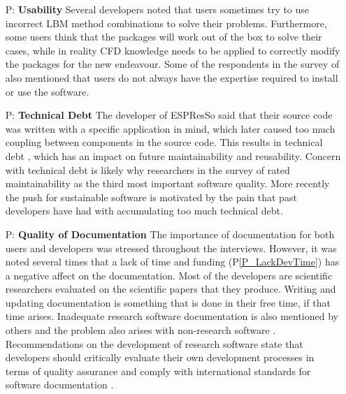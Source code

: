 \documentclass[final, 3p, times, authoryear]{elsarticle}
\newcounter{pnum} %
\newcommand{\ppref}[1]{P\ref{#1}}
\begin{document}
\begin{enumerate}
	\item[P\refstepcounter{pnum}\thepnum \label{P_Usability}:]
	\textbf{Usability} Several developers noted that users sometimes try to use
	incorrect LBM method combinations to solve their problems. Furthermore, some
	users think that the packages will work out of the box to solve their cases,
	while in reality CFD knowledge needs to be applied to correctly modify the
	packages for the new endeavour.  Some of the respondents in the survey of
	\citep{WieseEtAl2019} also mentioned that users do not always have the
	expertise required to install or use the software.
	
	\item[P\refstepcounter{pnum}\thepnum \label{P_TechDebt}:] \textbf{Technical
	Debt} The developer of ESPResSo said that their source code was written with
	a specific application in mind, which later caused too much coupling between
	components in the source code. This results in technical debt
	\citet{KruchtenEtAl2012}, which has an impact on future maintainability and
	reusability. Concern with technical debt is likely why researchers in the
	survey of \citep{Nguyen-HoanEtAl2010} rated maintainability as the third
	most important software quality. More recently the push for sustainable
	software \citet{deSouzaEtAl2019} is motivated by the pain that past
	developers have had with accumulating too much technical debt.

	\item[P\refstepcounter{pnum}\thepnum \label{P_Documentation}:]
	\textbf{Quality of Documentation}  The importance of documentation for both
	users and developers was stressed throughout the interviews. However, it was
	noted several times that a lack of time and funding (\ppref{P_LackDevTime})
	has a negative affect on the documentation. Most of the developers are
	scientific researchers evaluated on the scientific papers that they produce.
	Writing and updating documentation is something that is done in their free
	time, if that time arises. Inadequate research software documentation is
	also mentioned by others \citep{PintoEtAl2018, WieseEtAl2019} and the
	problem also arises with non-research software \citep{LethbridgeEtAl2003}.
	Recommendations on the development of research software state that
	developers should critically evaluate their own development processes in
	terms of quality assurance and comply with international standards for
	software documentation \citep{KaterbowAndFeulner2018}.

\end{enumerate}
\end{document}

